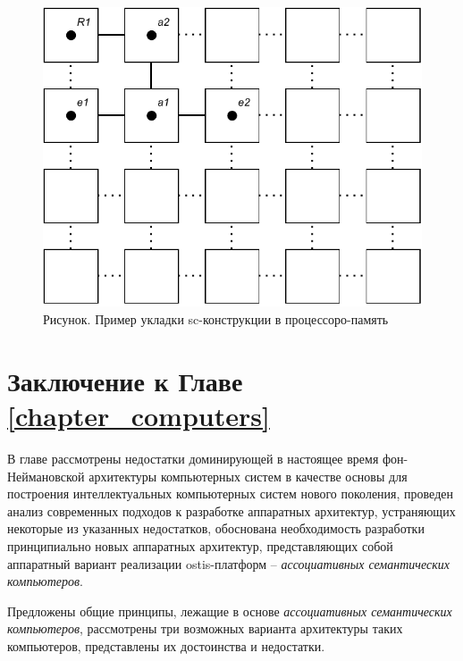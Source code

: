 \begin{figure}[H]
	\includegraphics[scale=1]{images/part6/chapter_computer/fine-grained architecture.pdf}
	\caption{Рисунок. Пример укладки sc-конструкции в процессоро-память}
	\label{fig:fine-grained-architecture}
\end{figure}

\section*{Заключение к Главе \ref{chapter_computers}}
В главе рассмотрены недостатки доминирующей в настоящее время фон-Неймановской архитектуры компьютерных систем в качестве основы для построения интеллектуальных компьютерных систем нового поколения, проведен анализ современных подходов к разработке аппаратных архитектур, устраняющих некоторые из указанных недостатков, обоснована необходимость разработки принципиально новых аппаратных архитектур, представляющих собой аппаратный вариант реализации ostis-платформ -- \textit{ассоциативных семантических компьютеров}.

Предложены общие принципы, лежащие в основе \textit{ассоциативных семантических компьютеров}, рассмотрены три возможных варианта архитектуры таких компьютеров, представлены их достоинства и недостатки.

